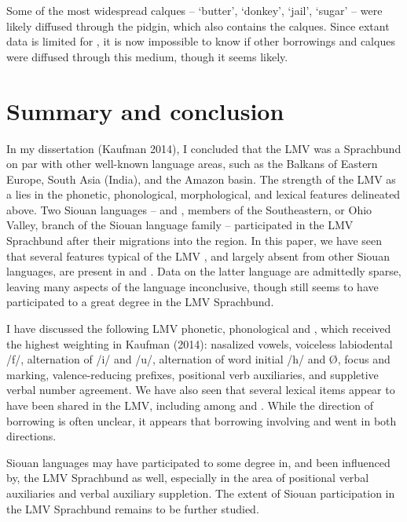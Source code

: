 \documentclass[output=paper]{LSP/langsci}
\begin{document}
	Some of the most widespread calques -- `butter', `donkey', `jail', `sugar' -- were likely diffused through the  pidgin, which also contains the calques. Since extant data is limited for , it is now impossible to know if other borrowings and calques were diffused through this medium, though it seems likely.

\section{Summary and conclusion}
	
In my dissertation (Kaufman 2014), I concluded that the LMV was a Sprachbund on par with other well-known language areas, such as the Balkans of Eastern Europe, South Asia (India), and the Amazon basin. The strength of the LMV as a  lies in the phonetic, phonological, morphological, and lexical features delineated above. Two Siouan languages --  and , members of the Southeastern, or Ohio Valley, branch of the Siouan language family -- participated in the LMV Sprachbund after their migrations into the region. In this paper, we have seen that several features typical of the LMV , and largely absent from other Siouan languages, are present in  and . Data on the latter language are admittedly sparse, leaving many aspects of the language inconclusive, though  still seems to have participated to a great degree in the LMV Sprachbund. 

I have discussed the following LMV phonetic, phonological and , which received the highest weighting in Kaufman (2014): nasalized vowels, voiceless labiodental  /f/, alternation of /i/ and /u/, alternation of word initial /h/ and Ø, focus and  marking, valence-reducing prefixes, positional verb auxiliaries, and suppletive verbal number agreement. We have also seen that several lexical items appear to have been shared in the LMV, including among  and . While the direction of borrowing is often unclear, it appears that borrowing involving  and  went in both directions.

 Siouan languages may have participated to some degree in, and been influenced by, the LMV Sprachbund as well, especially in the area of positional verbal auxiliaries and verbal auxiliary suppletion. The extent of  Siouan participation in the LMV Sprachbund remains to be further studied.
\end{document}
